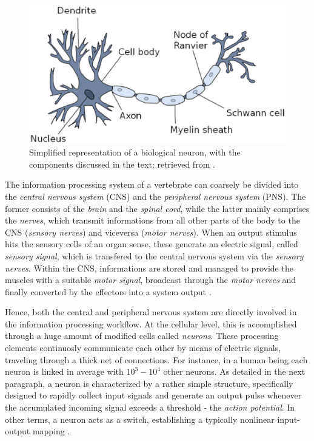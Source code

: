 \documentclass[12pt, a4paper, twoside, openright]{report}
\numberwithin{equation}{chapter}
\theoremstyle{theorem}
\theoremstyle{definition}
\theoremstyle{remark}
\theoremstyle{proposition}
\numberwithin{figure}{chapter}
\begin{document}
		\begin{figure}[t]
			\center
			\includegraphics[scale = 0.5]{neuron.eps}
			
			\caption{Simplified representation of a biological neuron, with the components discussed in the text; retrieved from \cite{Kri}.}
			\label{fig:neuron}
		\end{figure}
		
		The information processing system of a vertebrate can coarsely be divided into the \emph{central nervous system} (CNS) and the \emph{peripheral nervous system} (PNS). The former consists of the \emph{brain} and the \emph{spinal cord}, while the latter mainly comprises the \emph{nerves}, which transmit informations from all other parts of the body to the CNS (\emph{sensory nerves}) and viceversa (\emph{motor nerves}). When an output stimulus hits the sensory cells of an organ sense, these generate an electric signal, called \emph{sensory signal}, which is transfered to the central nervous system via the \emph{sensory nerves}. Within the CNS, informations are stored and managed to provide the muscles with a suitable \emph{motor signal}, broadcast through the \emph{motor nerves} and finally converted by the effectors into a system output \cite{Hay05}. %
		
		Hence, both the central and peripheral nervous system are directly involved in the information processing workflow. At the cellular level, this is accomplished through a huge amount of modified cells called \emph{neurons}. These processing elements continuosly communicate each other by means of electric signals, traveling through a thick net of connections. For instance, in a human being each neuron is linked in average with $10^3 - 10^4$ other neurons. As detailed in the next paragraph, a neuron is characterized by a rather simple structure, specifically designed to rapidly collect input signals and generate an output pulse whenever the accumulated incoming signal exceeds a threshold - the \emph{action potential}. In other terms, a neuron acts as a switch, establishing a typically nonlinear input-output mapping \cite{Kri}.
		
\end{document}
